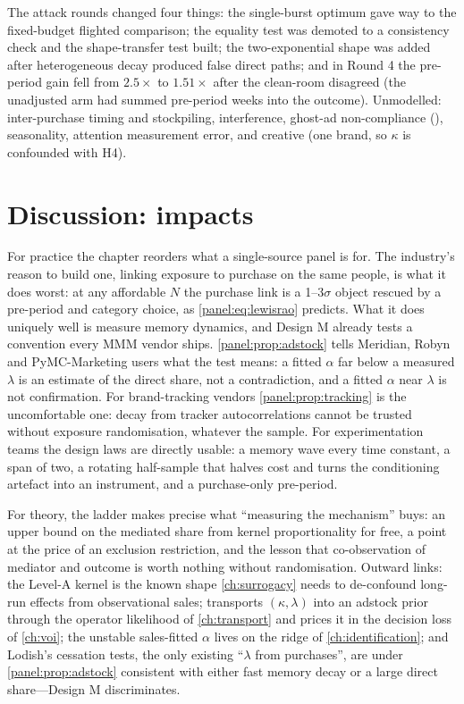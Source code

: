 The attack rounds changed four things: the single-burst optimum gave way to the fixed-budget flighted comparison; the equality test was demoted to a consistency check and the shape-transfer test built; the two-exponential shape was added after heterogeneous decay produced false direct paths; and in Round 4 the pre-period gain fell from $2.5\times$ to $1.51\times$ after the clean-room disagreed (the unadjusted arm had summed pre-period weeks into the outcome). Unmodelled: inter-purchase timing and stockpiling, interference, ghost-ad non-compliance (), seasonality, attention measurement error, and creative (one brand, so $\kappa$ is confounded with H4).

\section{Discussion: impacts}

For practice the chapter reorders what a single-source panel is for. The industry's reason to build one, linking exposure to purchase on the same people, is what it does worst: at any affordable $N$ the purchase link is a 1--3$\sigma$ object rescued by a pre-period and category choice, as \cref{panel:eq:lewisrao} predicts. What it does uniquely well is measure memory dynamics, and Design M already tests a convention every MMM vendor ships. \cref{panel:prop:adstock} tells Meridian, Robyn and PyMC-Marketing users what the test means: a fitted $\alpha$ far below a measured $\lambda$ is an estimate of the direct share, not a contradiction, and a fitted $\alpha$ near $\lambda$ is not confirmation. For brand-tracking vendors \cref{panel:prop:tracking} is the uncomfortable one: decay from tracker autocorrelations cannot be trusted without exposure randomisation, whatever the sample. For experimentation teams the design laws are directly usable: a memory wave every time constant, a span of two, a rotating half-sample that halves cost and turns the conditioning artefact into an instrument, and a purchase-only pre-period.

For theory, the ladder makes precise what ``measuring the mechanism'' buys: an upper bound on the mediated share from kernel proportionality for free, a point at the price of an exclusion restriction, and the lesson that co-observation of mediator and outcome is worth nothing without randomisation. Outward links: the Level-A kernel is the known shape \cref{ch:surrogacy} needs to de-confound long-run effects from observational sales;  transports $(\kappa, \lambda)$ into an adstock prior through the operator likelihood of \cref{ch:transport} and prices it in the decision loss of \cref{ch:voi}; the unstable sales-fitted $\alpha$ lives on the ridge of \cref{ch:identification}; and Lodish's cessation tests, the only existing ``$\lambda$ from purchases'', are under \cref{panel:prop:adstock} consistent with either fast memory decay or a large direct share---Design M discriminates.

